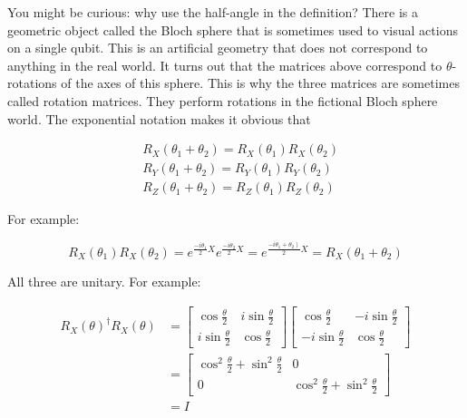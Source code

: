 \documentclass[main.tex]{subfiles}
\begin{document}
    You might be curious: why use the half-angle in the definition? There is a geometric object called the Bloch sphere that is sometimes used to visual actions on a single qubit. This is an artificial geometry that does not correspond to anything in the real world. It turns out that the matrices above correspond to $\theta$-rotations of the axes of this sphere. This is why the three matrices are sometimes called rotation matrices. They perform rotations in the fictional Bloch sphere world. The exponential notation makes it obvious that
    
    $$
    \begin{aligned}
    &R_{X}\left(\theta_{1}+\theta_{2}\right)=R_{X}\left(\theta_{1}\right) R_{X}\left(\theta_{2}\right) \\
    &R_{Y}\left(\theta_{1}+\theta_{2}\right)=R_{Y}\left(\theta_{1}\right) R_{Y}\left(\theta_{2}\right) \\
    &R_{Z}\left(\theta_{1}+\theta_{2}\right)=R_{Z}\left(\theta_{1}\right) R_{Z}\left(\theta_{2}\right)
    \end{aligned}
    $$
    
    For example:
    
    $$
    R_{X}\left(\theta_{1}\right) R_{X}\left(\theta_{2}\right)=e^{\frac{-i \theta_{1}}{2} X} e^{\frac{-i \theta_{2}}{2} X}=e^{\frac{\left.-i \theta_{1}+\theta_{2}\right)}{2} X}=R_{X}\left(\theta_{1}+\theta_{2}\right)
    $$
    
    All three are unitary. For example:
    
    $$
    \begin{aligned}
    R_{X}(\theta)^{\dagger} R_{X}(\theta) &=\left[\begin{array}{cc}
    \cos \frac{\theta}{2} & i \sin \frac{\theta}{2} \\
    i \sin \frac{\theta}{2} & \cos \frac{\theta}{2}
    \end{array}\right]\left[\begin{array}{cc}
    \cos \frac{\theta}{2} & -i \sin \frac{\theta}{2} \\
    -i \sin \frac{\theta}{2} & \cos \frac{\theta}{2}
    \end{array}\right] \\
    &=\left[\begin{array}{cc}
    \cos ^{2} \frac{\theta}{2}+\sin ^{2} \frac{\theta}{2} & 0 \\
    0 & \cos ^{2} \frac{\theta}{2}+\sin ^{2} \frac{\theta}{2}
    \end{array}\right] \\
    &=I
    \end{aligned}
    $$
    
\end{document}
